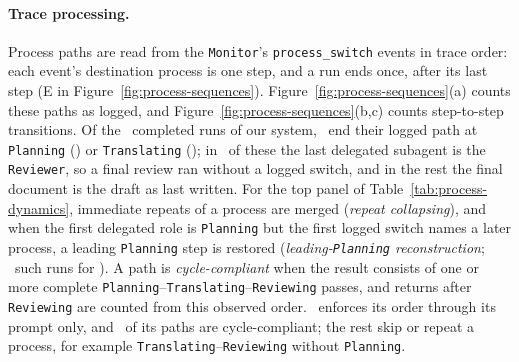\paragraph{Trace processing.}
Process paths are read from the \texttt{Monitor}'s \texttt{process\_switch} events in trace order: each event's destination process is one step, and a run ends once, after its last step (E in Figure~\ref{fig:process-sequences}).
Figure~\ref{fig:process-sequences}(a) counts these paths as logged, and Figure~\ref{fig:process-sequences}(b,c) counts step-to-step transitions.
Of the \AfourRunCount\ completed runs of our system, \AfourEndBeforeReviewingRuns\ end their logged path at \texttt{Planning} (\AfourEndPlanningRuns) or \texttt{Translating} (\AfourEndTranslatingRuns); in \AfourEndLastReviewerRuns\ of these the last delegated subagent is the \texttt{Reviewer}, so a final review ran without a logged switch, and in the rest the final document is the draft as last written.
For the top panel of Table~\ref{tab:process-dynamics}, immediate repeats of a process are merged (\emph{repeat collapsing}), and when the first delegated role is \texttt{Planning} but the first logged switch names a later process, a leading \texttt{Planning} step is restored (\emph{leading-\texttt{Planning} reconstruction}; \AfourLeadingReconstruction\ such runs for \condAgenticCogWriter).
A path is \emph{cycle-compliant} when the result consists of one or more complete \texttt{Planning}--\texttt{Translating}--\texttt{Reviewing} passes, and returns after \texttt{Reviewing} are counted from this observed order.
\condFixedOrder\ enforces its order through its prompt only, and \AsixCycleCompliantRate\ of its paths are cycle-compliant; the rest skip or repeat a process, for example \texttt{Translating}--\texttt{Reviewing} without \texttt{Planning}.


